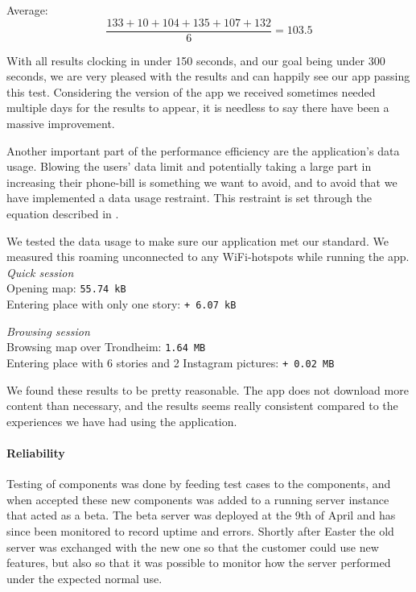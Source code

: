 Average: 
\begin{equation}
\frac{133 + 10 + 104 + 135 + 107 + 132}{6} = {103.5}
\end{equation}

With all results clocking in under 150 seconds, and our goal being under 300 seconds, we are very pleased with the results and can happily see our app passing this test. Considering the version of the app we received sometimes needed multiple days for the results to appear, it is needless to say there have been a massive improvement.


Another important part of the performance efficiency are the application's data usage. Blowing the users' data limit and potentially taking a large part in increasing their phone-bill is something we want to avoid, and to avoid that we have implemented a data usage restraint. This restraint is set through the equation described in .

We tested the data usage to make sure our application met our standard. We measured this roaming unconnected to any WiFi-hotspots while running the app.\\

\emph{Quick session}\\
Opening map: \texttt{55.74 kB}\\
Entering place with only one story: \texttt{+ 6.07 kB}

\emph{Browsing session}\\
Browsing map over Trondheim: \texttt{1.64 MB}\\
Entering place with 6 stories and 2 Instagram pictures: \texttt{+ 0.02 MB}

We found these results to be pretty reasonable. The app does not download more content than necessary, and the results seems really consistent compared to the experiences we have had using the application.

\paragraph{Reliability}

Testing of components was done by feeding test cases to the components, and when accepted these new components was added to a running server instance that acted as a beta. The beta server was deployed at the 9th of April and has since been monitored to record uptime and errors. Shortly after Easter the old server was exchanged with the new one so that the customer could use new features, but also so that it was possible to monitor how the server performed under the expected normal use.

